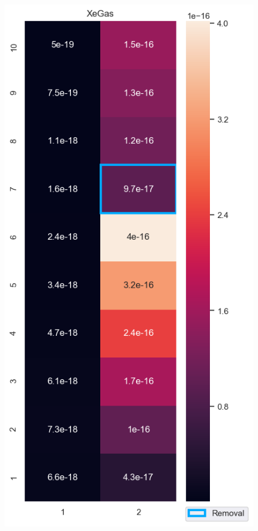 \begin{figure}[ht]
\begin{minipage}{.5\textwidth}
  \label{fig:XeliqHeatMap}
\end{minipage}%
\begin{minipage}{.5\textwidth}
  \centering
  \includegraphics[width=1\linewidth]{images/XeGasHeatMap.png}
  \label{fig:XeGasHeatMap}
\end{minipage}
\end{figure}

